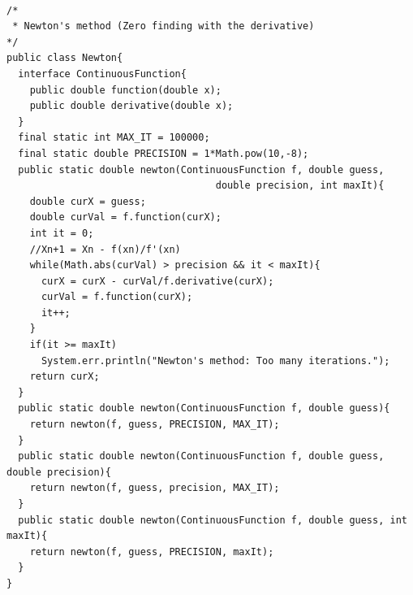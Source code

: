 \documentclass{article}
\begin{document}
\begin{verbatim}

/*
 * Newton's method (Zero finding with the derivative)
*/
public class Newton{
  interface ContinuousFunction{
    public double function(double x);
    public double derivative(double x);
  }
  final static int MAX_IT = 100000;
  final static double PRECISION = 1*Math.pow(10,-8);
  public static double newton(ContinuousFunction f, double guess,
                                    double precision, int maxIt){
    double curX = guess;
    double curVal = f.function(curX);
    int it = 0;
    //Xn+1 = Xn - f(xn)/f'(xn)
    while(Math.abs(curVal) > precision && it < maxIt){
      curX = curX - curVal/f.derivative(curX);
      curVal = f.function(curX);
      it++;
    }
    if(it >= maxIt)
      System.err.println("Newton's method: Too many iterations.");
    return curX;
  }
  public static double newton(ContinuousFunction f, double guess){
    return newton(f, guess, PRECISION, MAX_IT);
  }
  public static double newton(ContinuousFunction f, double guess, double precision){
    return newton(f, guess, precision, MAX_IT);
  }
  public static double newton(ContinuousFunction f, double guess, int maxIt){
    return newton(f, guess, PRECISION, maxIt);
  }
}

\end{verbatim}
\end{document}
